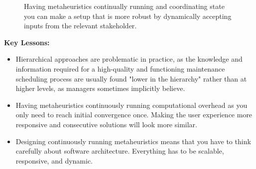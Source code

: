 \begin{figure}[H]
	\centering
	
	\caption{
		Having metaheuristics continually running and coordinating state you can make a setup that is more robust by dynamically accepting inputs from the relevant stakeholder.  
	}
	\label{
		fig:asynchronous_model_setup
	}
\end{figure}

\textbf{Key Lessons:}
\begin{itemize}
	\item Hierarchical approaches are problematic in practice, as the knowledge and information required for a high-quality and functioning maintenance 
		  scheduling process are usually found "lower in the hierarchy" rather than at higher levels, as managers sometimes implicitly believe.
	\item Having metaheuristics continuously running computational overhead as you only need to reach initial convergence once. Making the 
	      user experience more responsive and consecutive solutions will look more similar.
	\item Designing continuously running metaheuristics means that you have to think carefully about software architecture. Everything has to
		  be scalable, responsive, and dynamic. 
\end{itemize}

